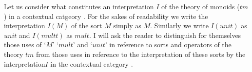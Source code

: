 

\note Let us consider what constitutes an interpretation $I$ of the theory of monoids ($tm$) in a contextual catgeory \catc.
For the sakes of readability we write the interpretation $I(M)$ of the sort $M$ simply as $M$. Similarly we write $I(unit)$ as $unit$ and $I(multt)$ as $mult$. I will ask the reader  to distinguish for themselves 
those uses of `$M$' `$mult$' and `$unit$' in reference to sorts and operators of the theory $tm$ from those uses in reference to the interpretation of these sorts by the interpretation$I$ in the contextual category \catc. 

\newcommand{\wM}{\ofT{w}{M}}
\newcommand{\xM}{\ofT{x_1, x_2}{M}}
\newcommand{\yM}{\ofT{y_1, y_2, y_3}{M}}
\newcommand{\doubleM}{M^2}                       %
\newcommand{\trebleM}{M^3}                       %
\newcommand{\quadM}{M^4}                         %
\newcommand{\spi}{s(p_{M^3,M^i})}
\newcommand{\sptrebleone}{s(p_{M^3,M^1})}
\newcommand{\sptrebletwo}{s(p_{M^3,M^2})}
\newcommand{\sptreblethree}{s(p_{M^3,M^3})}

